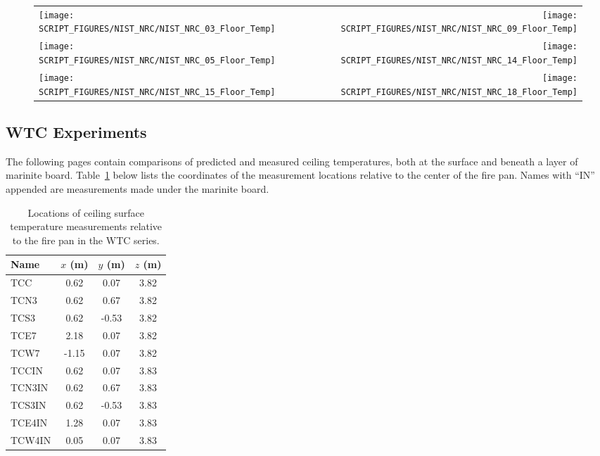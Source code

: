\begin{figure}[p]
\begin{tabular*}{\textwidth}{l@{\extracolsep{\fill}}r}
\texttt{[image: SCRIPT\_FIGURES/NIST\_NRC/NIST\_NRC\_03\_Floor\_Temp]} &
\texttt{[image: SCRIPT\_FIGURES/NIST\_NRC/NIST\_NRC\_09\_Floor\_Temp]} \\
\texttt{[image: SCRIPT\_FIGURES/NIST\_NRC/NIST\_NRC\_05\_Floor\_Temp]} &
\texttt{[image: SCRIPT\_FIGURES/NIST\_NRC/NIST\_NRC\_14\_Floor\_Temp]} \\
\texttt{[image: SCRIPT\_FIGURES/NIST\_NRC/NIST\_NRC\_15\_Floor\_Temp]} &
\texttt{[image: SCRIPT\_FIGURES/NIST\_NRC/NIST\_NRC\_18\_Floor\_Temp]}
\end{tabular*}
\label{NIST_NRC_Floor_Temp_Open}
\end{figure}

\clearpage


\subsection{WTC Experiments}

The following pages contain comparisons of predicted and measured ceiling temperatures, both at the surface and beneath a layer of marinite board. Table~\ref{WTC_Ceiling} below lists the coordinates of the measurement locations relative to the center of the fire pan. Names with ``IN'' appended are measurements made under the marinite board.


\begin{table}[h!]
\caption[Ceiling surface measurement locations for the WTC series]{Locations of ceiling surface temperature measurements relative to the fire pan in the WTC series.}
\begin{center}
\begin{tabular}{|l|c|c|c|}
\hline
Name                & $x$ (m)   & $y$ (m)   & $z$ (m)   \\ \hline \hline
TCC                 & 0.62      & 0.07      & 3.82      \\ \hline
TCN3                & 0.62      & 0.67      & 3.82      \\ \hline
TCS3                & 0.62      & -0.53     & 3.82      \\ \hline
TCE7                & 2.18      & 0.07      & 3.82      \\ \hline
TCW7                & -1.15     & 0.07      & 3.82      \\ \hline \hline
TCCIN               & 0.62      & 0.07      & 3.83      \\ \hline
TCN3IN              & 0.62      & 0.67      & 3.83      \\ \hline
TCS3IN              & 0.62      & -0.53     & 3.83      \\ \hline
TCE4IN              & 1.28      & 0.07      & 3.83      \\ \hline
TCW4IN              & 0.05      & 0.07      & 3.83      \\ \hline
\end{tabular}
\end{center}
\label{WTC_Ceiling}
\end{table}

